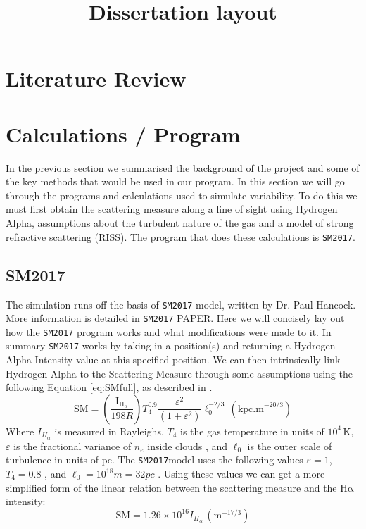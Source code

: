 \documentclass[a4paper]{article}
\def\halpha{$\mathrm{H\alpha}$\;}
\def\sm{\texttt{SM2017}}
\begin{document}
\title{Dissertation layout}
\tableofcontents{}
\newpage
\section{Literature Review}
%
\section{Calculations / Program}
In the previous section we summarised the background of the project and some of the key methods that would be used in our program. In this section we will go through the programs and calculations used to simulate variability. To do this we must first obtain the scattering measure along a line of sight using Hydrogen Alpha, assumptions about the turbulent nature of the gas and a model of strong refractive scattering (RISS). The program that does these calculations is \texttt{SM2017}.

\subsection{SM2017}\label{sec:SM2017}
The simulation runs off the basis of \texttt{SM2017} model, written by Dr. Paul Hancock. More information is detailed in \texttt{SM2017} PAPER\citet{H18}. Here we will concisely lay out how the \texttt{SM2017} program works and what modifications were made to it. In summary \texttt{SM2017} works by taking in a position(s) and returning a Hydrogen Alpha Intensity value at this specified position. We can then intrinsically link Hydrogen Alpha to the Scattering Measure through some assumptions using the following Equation \ref{eq:SMfull}, as described in \citet{Haffner}.
\begin{equation}
\mathrm{SM} = \left(\frac{\mathrm{I_{H_\alpha}}}{198R}\right)T_4^{0.9}\frac{\varepsilon^{2}}{(1+\varepsilon^2)}\ell_0^{-2/3}\, (\mathrm{kpc.m}^{-20/3})
\label{eq:SMfull}
\end{equation}
Where $I_{H_\alpha}$ is measured in Rayleighs, $T_4$ is the gas temperature in units of $10^4$\,K, $\varepsilon$ is the fractional variance of $n_e$ inside clouds , and $\ell_0$ is the outer scale of turbulence in units of pc.
The \sm model uses the following values $\varepsilon = 1$,  $T_4=0.8$ \citep{Haffner}, and $\ell_0 = 10^{18}m = 32pc$ \citep{Armstrong}.
Using these values we can get a more simplified form of the linear relation between the scattering measure and the \halpha{} intensity:
\begin{equation}
\mathrm{SM} = 1.26\times 10^{16} I_{H_\alpha}\, (\mathrm{m}^{-17/3})
\label{eq:SMshort}
\end{equation}
\end{document}
